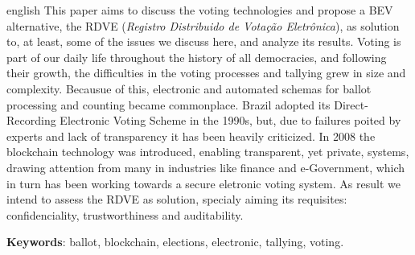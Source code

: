 \begin{resumo}[Abstract]
\begin{otherlanguage*}{english}  
	\vspace{\onelineskip}
	\noindent
		This paper aims to discuss the voting technologies and propose a BEV alternative, the RDVE (\textit{Registro Distribuido de Votação Eletrônica}), as solution to, at least, some of the issues we discuss here, and analyze its results. Voting is part of our daily life throughout the history of all democracies, and following their growth, the difficulties in the voting processes and tallying  grew in size and complexity. Becausue of this, electronic and automated schemas for ballot processing and counting became commonplace. Brazil adopted its Direct-Recording Electronic Voting Scheme in the 1990s, but, due to failures poited by experts and lack of transparency it has been heavily criticized. In 2008 the blockchain technology was introduced, enabling transparent, yet private, systems, drawing attention from many in industries like finance and e-Government, which in turn has been working towards a secure eletronic voting system. 
		As result we intend to assess the RDVE as solution, specialy aiming its requisites: confidenciality, trustworthiness and auditability. 
		\par\textbf{Keywords}: ballot, blockchain, elections, electronic, tallying, voting.
\end{otherlanguage*}
\end{resumo}